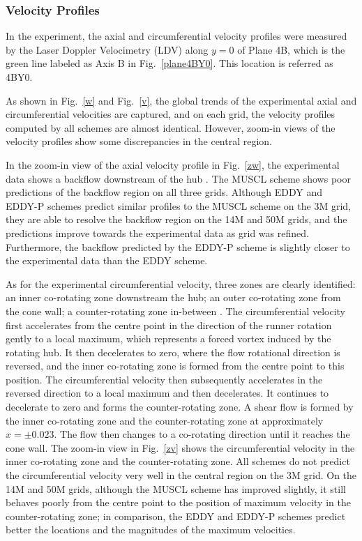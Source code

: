 \subsubsection{Velocity Profiles}
In the experiment, the axial and circumferential velocity profiles were measured by the Laser Doppler Velocimetry (LDV) along $y=0$ of Plane 4B, which is the green line labeled as Axis B in Fig.~\ref{plane4BY0}. This location is referred as 4BY0.

As shown in Fig.~\ref{w} and Fig.~\ref{v}, the global trends of the experimental axial and circumferential velocities are captured, and on each grid, the velocity profiles computed by all schemes are almost identical. However, zoom-in views of the velocity profiles show some discrepancies in the central region. 

In the zoom-in view of the axial velocity profile in Fig.~\ref{zw}, the experimental data shows a backflow downstream of the hub \cite{vuillemard2014experimental}. The MUSCL scheme shows poor predictions of the backflow region on all three grids. Although EDDY and EDDY-P schemes predict similar profiles to the MUSCL scheme on the 3M grid, they are able to resolve the backflow region on the 14M and 50M grids, and the predictions improve towards the experimental data as grid was refined. Furthermore, the backflow predicted by the EDDY-P scheme is slightly closer to the experimental data than the EDDY scheme.

As for the experimental circumferential velocity, three zones are clearly identified: an inner co-rotating zone downstream the hub; an outer co-rotating zone from the cone wall; a counter-rotating zone in-between \cite{vuillemard2014experimental}. The circumferential velocity first accelerates from the centre point in the direction of the runner rotation gently to a local maximum, which represents a forced vortex induced by the rotating hub. It then decelerates to zero, where the flow rotational direction is reversed, and the inner co-rotating zone is formed from the centre point to this position. The circumferential velocity then subsequently accelerates in the reversed direction to a local maximum and then decelerates. It continues to decelerate to zero and forms the counter-rotating zone.  A shear flow is formed by the inner co-rotating zone and the counter-rotating zone at approximately $x=\pm 0.023$. The flow then changes to a co-rotating direction until it reaches the cone wall. The zoom-in view in Fig.~\ref{zv} shows the circumferential velocity in the inner co-rotating zone and the counter-rotating zone. All schemes do not predict the circumferential velocity very well in the central region on the 3M grid. On the 14M and 50M grids, although the MUSCL scheme has improved slightly, it still behaves poorly from the centre point to the position of maximum velocity in the counter-rotating zone; in comparison, the EDDY and EDDY-P schemes predict better the locations and the magnitudes of the maximum velocities.

